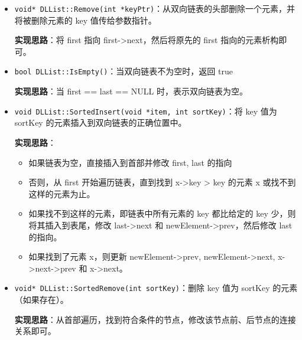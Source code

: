 \documentclass[a4paper,12pt]{article}
\begin{document}
\begin{itemize}
\item \texttt{void* DLList::Remove(int *keyPtr)}：从双向链表的头部删除一个元素，并将被删除元素的 key 值传给参数指针。
\par \textbf{实现思路}：将 first 指向 first->next，然后将原先的 first 指向的元素析构即可。
\item \texttt{bool DLList::IsEmpty()}：当双向链表不为空时，返回 true
\par \textbf{实现思路}：当 first == last == NULL 时，表示双向链表为空。
\item \texttt{void DLList::SortedInsert(void *item, int sortKey)}：将 key 值为 sortKey 的元素插入到双向链表的正确位置中。
\par \textbf{实现思路}：
\begin{itemize}
  \item 如果链表为空，直接插入到首部并修改 first, last 的指向
  \item 否则，从 first 开始遍历链表，直到找到 x->key > key 的元素 x 或找不到这样的元素为止。
    \item 如果找不到这样的元素，即链表中所有元素的 key 都比给定的 key 少，则将其插入到表尾，修改 last->next 和 newElement->prev，然后修改 last 的指向。
    \item 如果找到了元素 x，则更新 newElement->prev, newElement->next, x->next->prev 和 x->next。
\end{itemize}
\item \texttt{void* DLList::SortedRemove(int sortKey)}：删除 key 值为 sortKey 的元素（如果存在）。
\par \textbf{实现思路}：从首部遍历，找到符合条件的节点，修改该节点前、后节点的连接关系即可。
\end{itemize}
\end{document}
